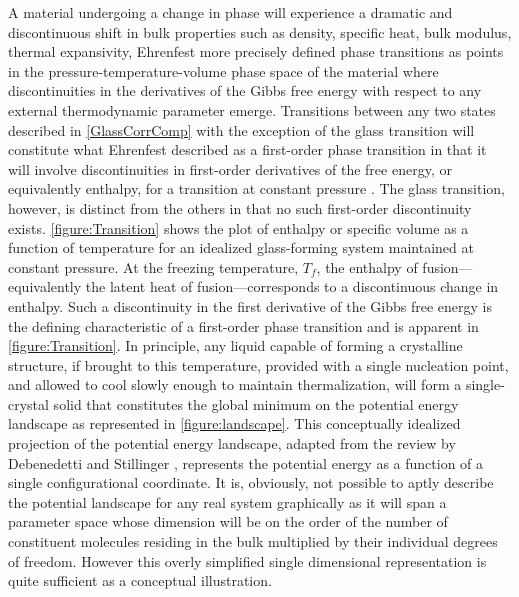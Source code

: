 A material undergoing a change in phase will experience a dramatic and discontinuous shift in bulk properties such as density, specific heat, bulk modulus, thermal expansivity, \etc  Ehrenfest more precisely defined phase transitions as points in the pressure-temperature-volume phase space of the material where discontinuities in the derivatives of the Gibbs free energy with respect to any external thermodynamic parameter emerge.  Transitions between any two states described in \fig \nolinebreak \ref{GlassCorrComp} with the exception of the glass transition will constitute what Ehrenfest described as a first-order phase transition in that it will involve discontinuities in first-order derivatives of the free energy, or equivalently enthalpy, for a transition at constant pressure \nolinebreak \cite{Jaeger}.  The glass transition, however, is distinct from the others in that no such first-order discontinuity exists.  \fig \nolinebreak \ref{figure:Transition} shows the plot of enthalpy or specific volume as a function of temperature for an idealized glass-forming system maintained at constant pressure.  At the freezing temperature, $T_f$, the enthalpy of fusion—equivalently the latent heat of fusion—corresponds to a discontinuous change in enthalpy. Such a discontinuity in the first derivative of the Gibbs free energy is the defining characteristic of a first-order phase transition and is apparent in \fig \nolinebreak \ref{figure:Transition}. In principle, any liquid capable of forming a crystalline structure, if brought to this temperature, provided with a single nucleation point, and allowed to cool slowly enough to maintain thermalization, will form a single-crystal solid that constitutes the global minimum on the potential energy landscape as represented in \fig \nolinebreak \ref{figure:landscape}.  This conceptually idealized projection of the potential energy landscape, adapted from the review by Debenedetti and Stillinger \cite{Debenedetti}, represents the potential energy as a function of a single configurational coordinate. It is, obviously, not possible to aptly describe the potential landscape for any real system graphically as it will span a parameter space whose dimension will be on the order of the number of constituent molecules residing in the bulk multiplied by their individual degrees of freedom.  However this overly simplified single dimensional representation is quite sufficient as a conceptual illustration.  

